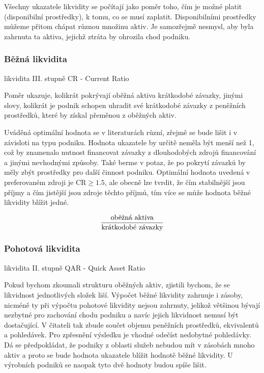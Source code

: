 Všechny ukazatele likvidity se počítají jako poměr toho, čím je možné platit (disponibilní prostředky), k tomu, co se musí zaplatit. Disponibilními prostředky můžeme přitom chápat různou množinu aktiv. Je samozřejmě nesmysl, aby byla zahrnuta ta aktiva, jejichž ztráta by ohrozila chod podniku.

\subsubsection{Běžná likvidita} 
likvidita III. stupně
CR - Current Ratio

Poměr ukazuje, kolikrát pokrývají oběžná aktiva krátkodobé závazky, jinými slovy, kolikrát je podnik schopen uhradit své krátkodobé závazky z peněžních prostředků, které by získal přeměnou z oběžných aktiv.

Uváděná optimální hodnota se v literaturách různí, zřejmě se bude lišit i v závisloti na typu podniku. Hodnota ukazatele by určitě neměla být menší než 1, což by znamenalo nutnost financovat závazky z dlouhodobých zdrojů financování a jinými nevhodnými způsoby. Také berme v potaz, že po pokrytí závazků by měly zbýt prostředky pro další činnost podniku.
Optimální hodnota uvedená v preferovaném zdroji je CR$\geq 1.5$, ale obecně lze tvrdit, že čím stabilnější jsou příjmy a čím jistější jsou zdroje těchto příjmů, tím více se může hodnota běžné likvidity blížit jedné\cite{businessvize_bez_likv}.

$$\dfrac{\text{oběžná aktiva}}{\text{krátkodobé závazky}}$$

\subsubsection{Pohotová likvidita} 
likvidita II. stupně
QAR - Quick Asset Ratio

Pokud bychom zkoumali strukturu oběžných aktiv, zjistili bychom, že se likvidnost jednotlivých složek liší. Výpočet běžné likvidity zahrnuje i zásoby, nicméně ty při výpočtu pohotové likvidity nejsou zahrnuty, jelikož většinou bývají nezbytné pro zachování chodu podniku a navíc jejich likvidnost nemusí být dostačující.
V čitateli tak zbude součet objemu peněžních prostředků, ekvivalentů a pohledávek. Pro zpřesnění výsledku je vhodné odečíst nedobytné pohledávky.
Dá se předpokládat, že podniky z oblasti služeb nebudou mít v zásobách mnoho aktiv a proto se bude hodnota ukazatele blížit hodnotě běžné likvidity. U výrobních podniků se naopak tyto dvě hodnoty budou spíše lišit.

